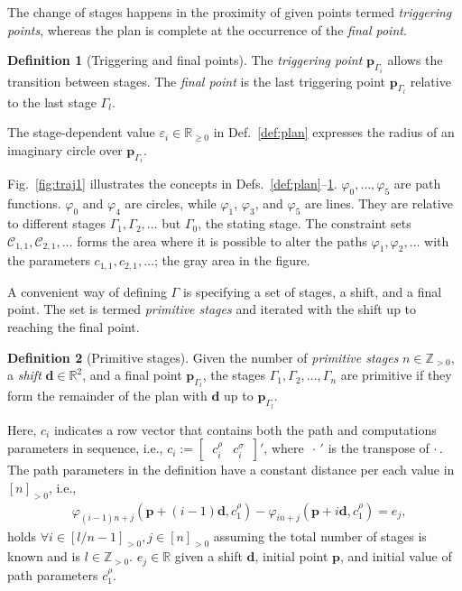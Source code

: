 \documentclass[letterpaper,10pt,journal,twoside]{IEEEtran}
\theoremstyle{definition}
\newtheorem{defn}{Definition}[section]
\begin{document}
The change of stages happens in the proximity of given points termed \emph{triggering points}, whereas the plan is complete at the occurrence of the \emph{final point}.

\begin{defn}[Triggering and final points]
  \label{def:trigs}
  The \emph{triggering point} $\mathbf{p}_{\Gamma_{i}}$ allows the transition between stages. The \emph{final point} is the last triggering point $\mathbf{p}_{\Gamma_{l}}$ relative to the last stage $\Gamma_l$.
\end{defn}

The stage-dependent value $\varepsilon_i\in\mathbb{R}_{\geq 0}$ in Def.~\ref{def:plan} expresses the radius of an imaginary circle over $\mathbf{p}_{\Gamma_i}$.

Fig.~\ref{fig:traj1} illustrates the concepts in Defs.~\ref{def:plan}--\ref{def:trigs}. $\varphi_0,\dots,\varphi_5$ are path functions. $\varphi_0$ and $\varphi_4$ are circles, while $\varphi_1$, $\varphi_3$, and $\varphi_5$ are lines. They are relative to different stages $\Gamma_1,\Gamma_2,\dots$ but $\Gamma_0$, the stating stage. The constraint sets $\mathcal{C}_{1,1},\mathcal{C}_{2,1},\dots$ forms the area where it is possible to alter the paths $\varphi_1,\varphi_2,\dots$ with the parameters $c_{1,1},c_{2,1},\dots$; the gray area in the figure. %

A convenient way of defining $\Gamma$ is specifying a set of stages, a shift, and a final point. The set is termed \emph{primitive stages} and iterated with the shift up to reaching the final point.

\begin{defn}[Primitive stages]
  \label{def:primitive}
  Given the number of \emph{primitive stages} $n\in\mathbb{Z}_{>0}$, a \emph{shift} $\mathbf{d}\in\mathbb{R}^2$, and a final point $\mathbf{p}_{\Gamma_l}$, the stages $\Gamma_1,\Gamma_2,\dots,\Gamma_n$ %
  are primitive if they form the remainder of the plan with $\mathbf{d}$ up to $\mathbf{p}_{\Gamma_l}$. 
\end{defn}

Here, $c_i$ indicates a row vector that contains both the path and computations parameters in sequence, i.e., $c_i:=[\begin{matrix}\,c_i^\rho & c_i^\sigma\,\end{matrix}]'$, where $\,\cdot\,'$ is the transpose of $\cdot\,$. The path parameters in the definition have a constant distance per each value in $[n]_{>0}$, i.e., 
\begin{equation}\label{eq:primitive}\begin{split}
  &\varphi_{(i-1)n+j}(\mathbf{p}+(i-1)\mathbf{d},c_1^\rho)-\varphi_{in+j}(\mathbf{p}+i\mathbf{d},c_1^\rho)=e_j,
\end{split}\end{equation}
holds $\forall i\in[l/n-1]_{>0},j\in[n]_{>0}$ assuming the total number of stages is known and is $l\in\mathbb{Z}_{>0}$. $e_j\in\mathbb{R}$ given a shift $\mathbf{d}$, initial point $\mathbf{p}$, and initial value of path parameters $c_1^\rho$.
\end{document}
